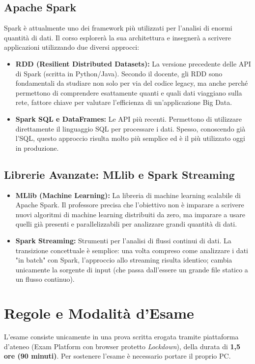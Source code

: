 \subsection*{Apache Spark}
Spark è attualmente uno dei framework più utilizzati per l'analisi di enormi quantità di dati. Il corso esplorerà la sua architettura e insegnerà a scrivere applicazioni utilizzando due diversi approcci:
\begin{itemize}
    \item \textbf{RDD (Resilient Distributed Datasets):} La versione precedente delle API di Spark (scritta in Python/Java). Secondo il docente, gli RDD sono fondamentali da studiare non solo per via del codice legacy, ma anche perché permettono di comprendere esattamente quanti e quali dati viaggiano sulla rete, fattore chiave per valutare l'efficienza di un'applicazione Big Data.
    \item \textbf{Spark SQL e DataFrames:} Le API più recenti. Permettono di utilizzare direttamente il linguaggio SQL per processare i dati. Spesso, conoscendo già l'SQL, questo approccio risulta molto più semplice ed è il più utilizzato oggi in produzione.
\end{itemize}

\subsection*{Librerie Avanzate: MLlib e Spark Streaming}
\begin{itemize}
    \item \textbf{MLlib (Machine Learning):} La libreria di machine learning scalabile di Apache Spark. Il professore precisa che l'obiettivo non è imparare a scrivere nuovi algoritmi di machine learning distribuiti da zero, ma imparare a usare quelli già presenti e parallelizzabili per analizzare grandi quantità di dati.
    \item \textbf{Spark Streaming:} Strumenti per l'analisi di flussi continui di dati. La transizione concettuale è semplice: una volta compreso come analizzare i dati "in batch" con Spark, l'approccio allo streaming risulta identico; cambia unicamente la sorgente di input (che passa dall'essere un grande file statico a un flusso continuo).
\end{itemize}

\section*{Regole e Modalità d'Esame}
L'esame consiste unicamente in una prova scritta erogata tramite piattaforma d'ateneo (Exam Platform con browser protetto \textit{Lockdown}), della durata di \textbf{1,5 ore (90 minuti)}. Per sostenere l'esame è necessario portare il proprio PC. 

